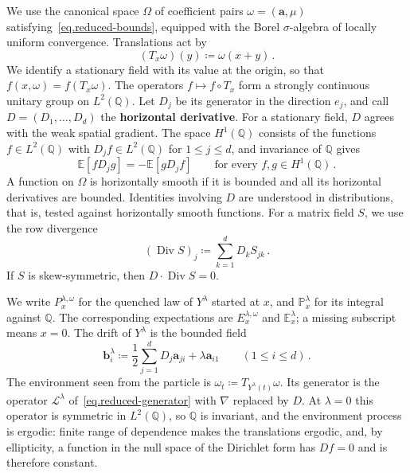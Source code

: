 \documentclass[11pt]{amsart}
\theoremstyle{definition}
\theoremstyle{remark}
\numberwithin{equation}{section}
\newcommand{\E}{\mathbb E}
\newcommand{\Q}{\mathbb Q}
\renewcommand{\a}{\mathbf a}
\renewcommand{\b}{\mathbf b}
\newcommand{\Div}{\operatorname{Div}}
\begin{document}
We use the canonical space $\Omega$ of coefficient pairs $\omega=(\a,\mu)$ satisfying~\eqref{eq.reduced-bounds}, equipped with the Borel $\sigma$-algebra of locally uniform convergence. Translations act by
\begin{equation}\label{eq.translations}
 (T_x\omega)(y)\coloneqq\omega(x+y)\, .
\end{equation}
We identify a stationary field with its value at the origin, so that $f(x,\omega)=f(T_x\omega)$. The operators $f\mapsto f\circ T_x$ form a strongly continuous unitary group on $L^2(\Q)$. Let $D_j$ be its generator in the direction $e_j$, and call $D=(D_1,\ldots,D_d)$ the \textbf{horizontal derivative}. For a stationary field, $D$ agrees with the weak spatial gradient. The space $H^1(\Q)$ consists of the functions $f\in L^2(\Q)$ with $D_jf\in L^2(\Q)$ for $1\leq j\leq d$, and invariance of $\Q$ gives
\begin{equation}\label{eq.horizontal-ibp}
 \E[fD_jg]=-\E[gD_jf]\qquad\text{for every }f,g\in H^1(\Q)\, .
\end{equation}
A function on $\Omega$ is horizontally smooth if it is bounded and all its horizontal derivatives are bounded. Identities involving $D$ are understood in distributions, that is, tested against horizontally smooth functions.
For a matrix field $S$, we use the row divergence
\begin{equation}\label{eq.matrix-divergence}
 (\Div S)_j\coloneqq\sum_{k=1}^d D_kS_{jk}\, .
\end{equation}
If $S$ is skew-symmetric, then $D\cdot\Div S=0$.

We write $P_x^{\lambda,\omega}$ for the quenched law of $Y^\lambda$ started at $x$, and $\mathbb P_x^\lambda$ for its integral against $\Q$. The corresponding expectations are $E_x^{\lambda,\omega}$ and $\mathbb E_x^\lambda$; a missing subscript means $x=0$. The drift of $Y^\lambda$ is the bounded field
\begin{equation}\label{eq.reduced-drift}
 \b_i^\lambda\coloneqq\frac12\sum_{j=1}^d D_j\a_{ji}+\lambda\a_{i1}
 \qquad(1\leq i\leq d)\, .
\end{equation}
The environment seen from the particle is $\omega_t\coloneqq T_{Y^\lambda(t)}\omega$. Its generator is the operator $\mathcal L^\lambda$ of~\eqref{eq.reduced-generator} with $\nabla$ replaced by $D$. At $\lambda=0$ this operator is symmetric in $L^2(\Q)$, so $\Q$ is invariant, and the environment process is ergodic: finite range of dependence makes the translations ergodic, and, by ellipticity, a function in the null space of the Dirichlet form has $Df=0$ and is therefore constant.
\end{document}
